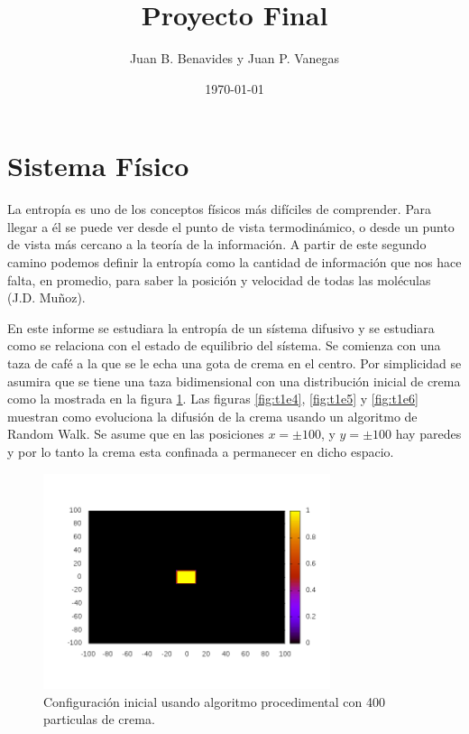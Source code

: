 \documentclass[12pt,twocolumn]{article}
\title{Proyecto Final}
\author{Juan B. Benavides y Juan P. Vanegas }
\date{\today}
\begin{document}
\maketitle

\section{\label{sec: Intro} Sistema Físico}
La entropía es uno de los conceptos físicos más difíciles de comprender. Para llegar a él se puede ver desde el punto de vista termodinámico, o desde un punto de vista más cercano a la teoría de la información. A partir de este segundo camino podemos definir la entropía como la cantidad de información que nos hace falta, en promedio, para saber la posición y velocidad de todas las moléculas (J.D. Muñoz). 

En este informe se estudiara la entropía de un sístema difusivo y se estudiara como se relaciona con el estado de equilibrio del sístema. Se comienza con una taza de café a la que se le echa una gota de crema en el centro. Por simplicidad se asumira que se tiene una taza bidimensional con una distribución inicial de crema como la mostrada en la figura \ref{fig:t0}. Las figuras \ref{fig:t1e4}, \ref{fig:t1e5} y \ref{fig:t1e6} muestran como evoluciona la difusión de la crema usando un algoritmo de Random Walk. Se asume que en las posiciones $x = \pm 100$, y $y= \pm 100$ hay paredes y por lo tanto la crema esta confinada a permanecer en dicho espacio.

\begin{figure}\label{fig:t0}
    \centering
    \includegraphics[width=0.75\textwidth]{figs/t_0.png}
    \caption{Configuración inicial usando algoritmo procedimental con 400 particulas de crema.}
\end{figure}
\end{document}
